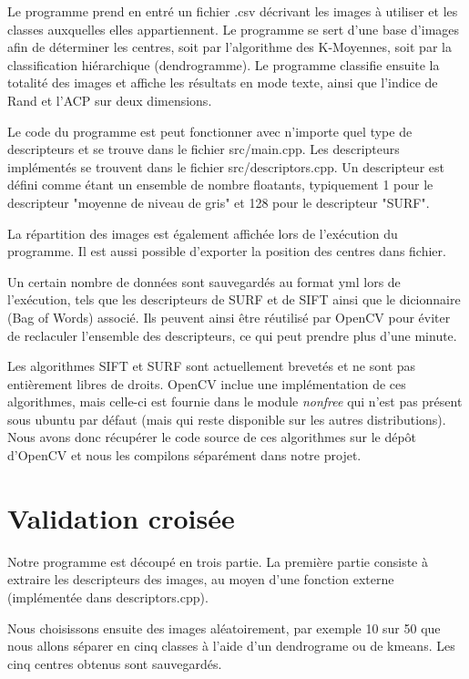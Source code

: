 \documentclass[12pt,a4paper,utf8x]{report}
\begin{document}
    Le programme prend en entré un fichier .csv décrivant les images à utiliser et les classes auxquelles elles appartiennent. Le programme se sert d'une base d'images afin de déterminer les centres, soit par l'algorithme des K-Moyennes, soit par la classification hiérarchique (dendrogramme). Le programme classifie ensuite la totalité des images et affiche les résultats en mode texte, ainsi que l'indice de Rand et l'ACP sur deux dimensions.

    Le code du programme est peut fonctionner avec n'importe quel type de descripteurs et se trouve dans le fichier src/main.cpp. Les descripteurs implémentés se trouvent dans le fichier src/descriptors.cpp. Un descripteur est défini comme étant un ensemble de nombre floatants, typiquement 1 pour le descripteur "moyenne de niveau de gris" et 128 pour le descripteur "SURF".

    La répartition des images est également affichée lors de l'exécution du programme. Il est aussi possible d'exporter la position des centres dans fichier.

    Un certain nombre de données sont sauvegardés au format yml lors de l'exécution, tels que les descripteurs de SURF et de SIFT ainsi que le dicionnaire (Bag of Words) associé. Ils peuvent ainsi être réutilisé par OpenCV pour éviter de reclaculer l'ensemble des descripteurs, ce qui peut prendre plus d'une minute.

    Les algorithmes SIFT et SURF sont actuellement brevetés et ne sont pas entièrement libres de droits. OpenCV inclue une implémentation de ces algorithmes, mais celle-ci est fournie dans le module \textit{nonfree} qui n'est pas présent sous ubuntu par défaut (mais qui reste disponible sur les autres distributions). Nous avons donc récupérer le code source de ces algorithmes sur le dépôt d'OpenCV et nous les compilons séparément dans notre projet.


\section{Validation croisée}
    Notre programme est découpé en trois partie. La première partie consiste à extraire les descripteurs des images, au moyen d'une fonction externe (implémentée dans descriptors.cpp).

    Nous choisissons ensuite des images aléatoirement, par exemple 10 sur 50 que nous allons séparer en cinq classes à l'aide d'un dendrograme ou de kmeans. Les cinq centres obtenus sont sauvegardés.
\end{document}
